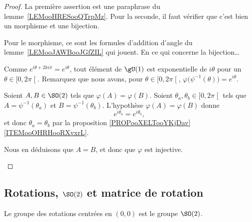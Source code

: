 \begin{proof}
	La première assertion est une paraphrase du lemme~\ref{LEMooHRESooQTrpMz}. Pour la seconde, il faut vérifier que c'est bien un morphisme et une bijection.

	Pour le morphisme, ce sont les formules d'addition d'angle du lemme~\ref{LEMooJAWBooJGfZIL} qui jouent. En ce qui concerne la bijection\ldots

	\begin{subproof}
		\spitem[Surjection]
		Comme \( e^{i\theta+2ki\pi}= e^{i\theta}\), tout élément de \( \gU(1)\) est exponentielle de \( i\theta\) pour un \( \theta\in\mathopen[ 0 , 2\pi \mathclose[\).
		\spitem[Injection]
		Remarquez que nous avons, pour \( \theta\in\mathopen[ 0 , 2\pi \mathclose[\), \( \varphi\big( \psi^{-1}(\theta) \big)= e^{i\theta}\).

		Soient \( A,B\in \SO(2)\) tels que \( \varphi(A)=\varphi(B)\). Soient \( \theta_a,\theta_b\in\mathopen[ 0 , 2\pi \mathclose[\) tels que \( A=\psi^{-1}(\theta_a)\) et \( B=\psi^{-1}(\theta_b)\). L'hypothèse \( \varphi(A)=\varphi(B)\) donne
		\begin{equation}
			e^{i\theta_a}= e^{i\theta_b},
		\end{equation}
		et donc \( \theta_a=\theta_b\) par la proposition \ref{PROPooXELTooYKjDav}\ref{ITEMooOHRHooRXvxrL}.

		Nous en déduisons que \( A=B\), et donc que \( \varphi\) est injective.
	\end{subproof}
\end{proof}




\subsection{Rotations, \( \SO(2)\) et matrice de rotation}

\begin{corollary} \label{CORooVYUJooDbkIFY}
	Le groupe des rotations centrées en \( (0,0)\) est le groupe \( \SO(2)\).
\end{corollary}

